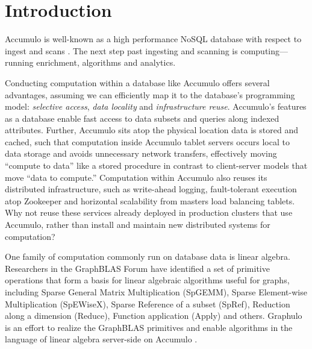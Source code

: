 
\section{Introduction}
\label{sIntro}
% 

Accumulo is well-known as a high performance NoSQL database with respect to ingest and scans \cite{sen2013benchmarking}.
The next step past ingesting and scanning is computing---running enrichment, algorithms and analytics.

Conducting computation within a database like Accumulo offers several advantages,
assuming we can efficiently map it to the database's programming model:
\emph{selective access}, \emph{data locality} and \emph{infrastructure reuse}.
Accumulo's features as a database enable fast access to data subsets and queries along indexed attributes.
Further, Accumulo sits atop the physical location data is stored and cached, such that computation inside
Accumulo tablet servers occurs local to data storage and avoids unnecessary network transfers,
effectively moving ``compute to data'' like a stored procedure
in contrast to client-server models that move ``data to compute.''
Computation within Accumulo also reuses its distributed infrastructure, 
such as write-ahead logging, fault-tolerant execution atop Zookeeper and 
horizontal scalability from masters load balancing tablets.
Why not reuse these services already deployed in production clusters that use Accumulo,
rather than install and maintain new distributed systems for computation?

One family of computation commonly run on database data is linear algebra.
Researchers in the GraphBLAS Forum \cite{mattson2014standards} have identified a set of primitive operations 
that form a basis for linear algebraic algorithms useful for graphs, including 
Sparse General Matrix Multiplication (SpGEMM),  Sparse Element-wise Multiplication (SpEWiseX),
Sparse Reference of a subset (SpRef), Reduction along a dimension (Reduce),
Function application (Apply) and others.
Graphulo is an effort to realize the GraphBLAS primitives 
and enable algorithms in the language of linear algebra server-side on Accumulo \cite{gadepally2015gabb}.


